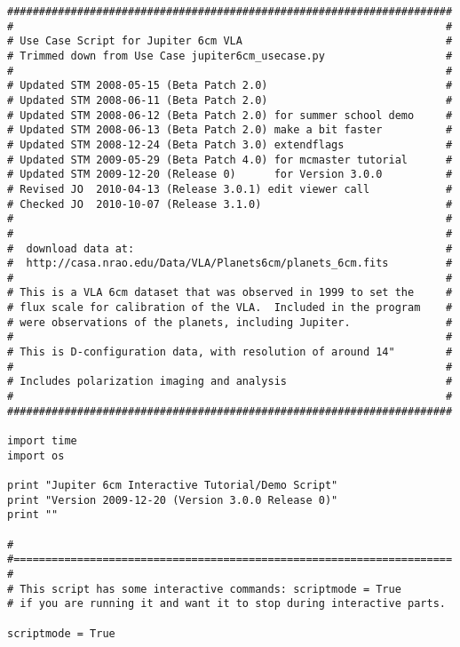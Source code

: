 \small
\begin{verbatim}
######################################################################
#                                                                    #
# Use Case Script for Jupiter 6cm VLA                                #
# Trimmed down from Use Case jupiter6cm_usecase.py                   #
#                                                                    #
# Updated STM 2008-05-15 (Beta Patch 2.0)                            #
# Updated STM 2008-06-11 (Beta Patch 2.0)                            #
# Updated STM 2008-06-12 (Beta Patch 2.0) for summer school demo     #
# Updated STM 2008-06-13 (Beta Patch 2.0) make a bit faster          #
# Updated STM 2008-12-24 (Beta Patch 3.0) extendflags                #
# Updated STM 2009-05-29 (Beta Patch 4.0) for mcmaster tutorial      #
# Updated STM 2009-12-20 (Release 0)      for Version 3.0.0          #
# Revised JO  2010-04-13 (Release 3.0.1) edit viewer call            #
# Checked JO  2010-10-07 (Release 3.1.0)                             #
#                                                                    #
#                                                                    #
#  download data at:                                                 #
#  http://casa.nrao.edu/Data/VLA/Planets6cm/planets_6cm.fits         #
#                                                                    #
# This is a VLA 6cm dataset that was observed in 1999 to set the     #
# flux scale for calibration of the VLA.  Included in the program    #
# were observations of the planets, including Jupiter.               #
#                                                                    #
# This is D-configuration data, with resolution of around 14"        #
#                                                                    #
# Includes polarization imaging and analysis                         #
#                                                                    #
######################################################################

import time
import os

print "Jupiter 6cm Interactive Tutorial/Demo Script"
print "Version 2009-12-20 (Version 3.0.0 Release 0)"
print ""

# 
#=====================================================================
#
# This script has some interactive commands: scriptmode = True
# if you are running it and want it to stop during interactive parts.

scriptmode = True


\end{verbatim}
